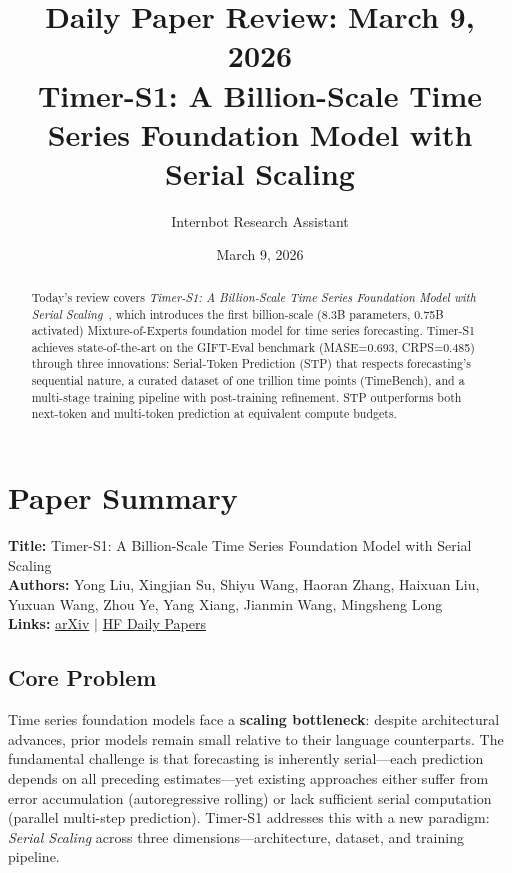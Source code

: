 \documentclass[11pt]{article}
\title{Daily Paper Review: March 9, 2026\\Timer-S1: A Billion-Scale Time Series Foundation Model with Serial Scaling}
\author{Internbot Research Assistant}
\date{March 9, 2026}
\begin{document}
\maketitle

\begin{abstract}
Today's review covers \emph{Timer-S1: A Billion-Scale Time Series Foundation Model with Serial Scaling}~\citep{liu2026timers1}, which introduces the first billion-scale (8.3B parameters, 0.75B activated) Mixture-of-Experts foundation model for time series forecasting. Timer-S1 achieves state-of-the-art on the GIFT-Eval benchmark (MASE=0.693, CRPS=0.485) through three innovations: Serial-Token Prediction (STP) that respects forecasting's sequential nature, a curated dataset of one trillion time points (TimeBench), and a multi-stage training pipeline with post-training refinement. STP outperforms both next-token and multi-token prediction at equivalent compute budgets.
\end{abstract}

\section{Paper Summary}

\textbf{Title:} Timer-S1: A Billion-Scale Time Series Foundation Model with Serial Scaling\\
\textbf{Authors:} Yong Liu, Xingjian Su, Shiyu Wang, Haoran Zhang, Haixuan Liu, Yuxuan Wang, Zhou Ye, Yang Xiang, Jianmin Wang, Mingsheng Long\\
\textbf{Links:}
\href{https://arxiv.org/abs/2603.04791}{arXiv} $\mid$
\href{https://huggingface.co/papers/2603.04791}{HF Daily Papers}

\subsection{Core Problem}

Time series foundation models face a \textbf{scaling bottleneck}: despite architectural advances, prior models remain small relative to their language counterparts. The fundamental challenge is that forecasting is inherently serial---each prediction depends on all preceding estimates---yet existing approaches either suffer from error accumulation (autoregressive rolling) or lack sufficient serial computation (parallel multi-step prediction). Timer-S1 addresses this with a new paradigm: \emph{Serial Scaling} across three dimensions---architecture, dataset, and training pipeline.
\end{document}
